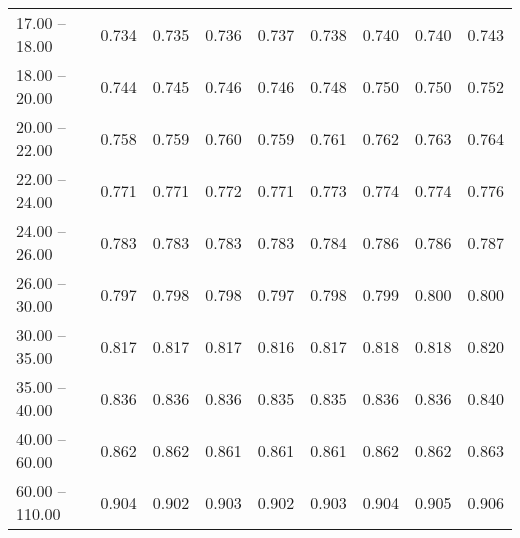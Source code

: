 \begin{table}[htp]
\begin{tiny}
\begin{center}
\begin{tabular}{|l|c|c|c|c|c|c|c|c|}
      17.00 -- 18.00 &  0.734 & 0.735 & 0.736 & 0.737 & 0.738 & 0.740 & 0.740 & 0.743 \\ 
      18.00 -- 20.00 &  0.744 & 0.745 & 0.746 & 0.746 & 0.748 & 0.750 & 0.750 & 0.752 \\ 
      20.00 -- 22.00 &  0.758 & 0.759 & 0.760 & 0.759 & 0.761 & 0.762 & 0.763 & 0.764 \\ 
      22.00 -- 24.00 &  0.771 & 0.771 & 0.772 & 0.771 & 0.773 & 0.774 & 0.774 & 0.776 \\ 
      24.00 -- 26.00 &  0.783 & 0.783 & 0.783 & 0.783 & 0.784 & 0.786 & 0.786 & 0.787 \\ 
      26.00 -- 30.00 &  0.797 & 0.798 & 0.798 & 0.797 & 0.798 & 0.799 & 0.800 & 0.800 \\ 
      30.00 -- 35.00 &  0.817 & 0.817 & 0.817 & 0.816 & 0.817 & 0.818 & 0.818 & 0.820 \\ 
      35.00 -- 40.00 &  0.836 & 0.836 & 0.836 & 0.835 & 0.835 & 0.836 & 0.836 & 0.840 \\ 
      40.00 -- 60.00 &  0.862 & 0.862 & 0.861 & 0.861 & 0.861 & 0.862 & 0.862 & 0.863 \\ 
      60.00 -- 110.00 &  0.904 & 0.902 & 0.903 & 0.902 & 0.903 & 0.904 & 0.905 & 0.906 \\ 
\hline
\end{tabular} 
             \end{center} 
             \end{tiny} 
             \label{tab:sa_long_jpsi8} 
             \end{table}



